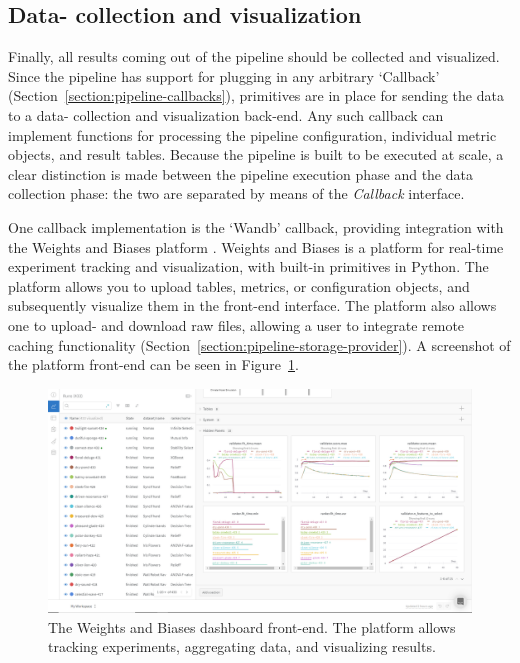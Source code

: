 \documentclass[../main.tex]{subfiles}
\begin{document}
\subsection{Data- collection and visualization}\label{section:pipeline-visualization}
Finally, all results coming out of the pipeline should be collected and visualized. Since the pipeline has support for plugging in any arbitrary `Callback' (Section~\ref{section:pipeline-callbacks}), primitives are in place for sending the data to a data- collection and visualization back-end. Any such callback can implement functions for processing the pipeline configuration, individual metric objects, and result tables. Because the pipeline is built to be executed at scale, a clear distinction is made between the pipeline execution phase and the data collection phase: the two are separated by means of the \textit{Callback} interface.

One callback implementation is the `Wandb' callback, providing integration with the Weights and Biases platform \citep{biewald_experiment_2020}. Weights and Biases is a platform for real-time experiment tracking and visualization, with built-in primitives in Python. The platform allows you to upload tables, metrics, or configuration objects, and subsequently visualize them in the front-end interface. The platform also allows one to upload- and download raw files, allowing a user to integrate remote caching functionality (Section~\ref{section:pipeline-storage-provider}). A screenshot of the platform front-end can be seen in Figure~\ref{fig:pipeline-wandb-frontend}.

\begin{figure}[ht]
    \centering
    \includegraphics[width=0.9\linewidth]{report/images/pipeline-wandb-frontend.PNG}
    \caption{The Weights and Biases dashboard front-end. The platform allows tracking experiments, aggregating data, and visualizing results.}
    \label{fig:pipeline-wandb-frontend}
\end{figure}
\end{document}
